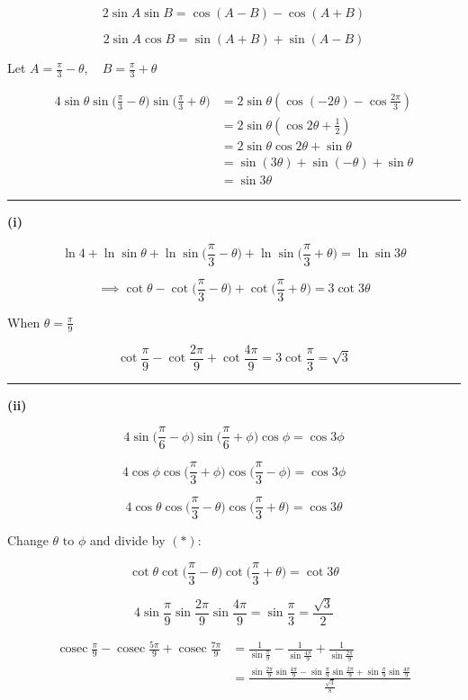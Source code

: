 \documentclass[12pt]{article}
\begin{document}
\newcommand{\ds}{\displaystyle}
\newcommand{\cosec}{\operatorname{cosec}}


$$2\sin A\sin B=\cos(A-B)-\cos(A+B)$$

$$2\sin A\cos B=\sin(A+B)+\sin(A-B)$$

Let $\ds A=\frac{\pi}{3}-\theta,\quad B=\frac{\pi}{3}+\theta$

\begin{align*}
4\sin\theta\sin\bigl(\frac{\pi}{3}-\theta\bigr)\sin\bigl(\frac{\pi}{3}+\theta\bigr)
&=2\sin\theta\left(\cos(-2\theta)-\cos\frac{2\pi}{3}\right)\\
&=2\sin\theta\left(\cos2\theta+\frac12\right)\\
&=2\sin\theta\cos2\theta+\sin\theta\\
&=\sin(3\theta)+\sin(-\theta)+\sin\theta\\
&=\sin3\theta
\end{align*}

\bigskip\hrule\bigskip

\textbf{(i)}

$$\ln4+\ln\sin\theta+\ln\sin\bigl(\frac{\pi}{3}-\theta\bigr)+\ln\sin\bigl(\frac{\pi}{3}+\theta\bigr)=\ln\sin3\theta$$

$$\implies \cot\theta-\cot\bigl(\frac{\pi}{3}-\theta\bigr)+\cot\bigl(\frac{\pi}{3}+\theta\bigr)=3\cot3\theta$$

When $\ds \theta=\frac{\pi}{9}$

$$\cot\frac{\pi}{9}-\cot\frac{2\pi}{9}+\cot\frac{4\pi}{9}=3\cot\frac{\pi}{3}=\sqrt3$$

\bigskip\hrule\bigskip

\textbf{(ii)} 

$$4\sin\bigl(\frac{\pi}{6}-\phi\bigr)\sin\bigl(\frac{\pi}{6}+\phi\bigr)\cos\phi=\cos3\phi$$

$$4\cos\phi\cos\bigl(\frac{\pi}{3}+\phi\bigr)\cos\bigl(\frac{\pi}{3}-\phi\bigr)=\cos3\phi$$

$$4\cos\theta\cos\bigl(\frac{\pi}{3}-\theta\bigr)\cos\bigl(\frac{\pi}{3}+\theta\bigr)=\cos3\theta$$

Change $\theta \text{ to } \phi$ and divide by $(*)$:

$$\cot\theta\cot\bigl(\frac{\pi}{3}-\theta\bigr)\cot\bigl(\frac{\pi}{3}+\theta\bigr)=\cot3\theta$$

$$4\sin\frac{\pi}{9}\sin\frac{2\pi}{9}\sin\frac{4\pi}{9}=\sin\frac{\pi}{3}=\frac{\sqrt3}{2}$$


\begin{align*}
\cosec\frac{\pi}{9}-\cosec\frac{5\pi}{9}+\cosec\frac{7\pi}{9}&=\frac{1}{\sin\frac{\pi}{9}}-\frac{1}{\sin\frac{4\pi}{9}}+\frac{1}{\sin\frac{2\pi}{9}}\\
&=\frac{\sin\frac{2\pi}{9}\sin\frac{4\pi}{9}-\sin\frac{\pi}{9}\sin\frac{2\pi}{9}+\sin\frac{\pi}{9}\sin\frac{4\pi}{9}}{\frac{\sqrt3}{8}}
\end{align*}
\end{document}
